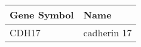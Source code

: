\begin{tabular}{ll}
\toprule
Gene Symbol &        Name \\
\midrule
      CDH17 & cadherin 17 \\
\bottomrule
\end{tabular}
